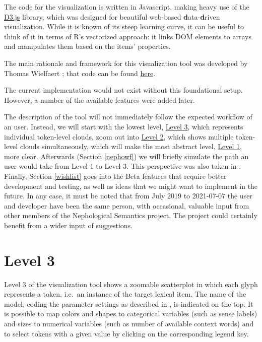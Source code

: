 \documentclass[
]{book}
\begin{document}
The code for the visualization is written in Javascript, making heavy use of the
\href{https://d3.js}{D3.js} library, which was designed for beautiful web-based
\textbf{d}ata-\textbf{d}riven visualization. While it is known of its steep learning curve,
it can be useful to think of it in terms of R's vectorized approach: it links
DOM elements to arrays and manipulates them based on the items' properties.

The main rationale and framework for this visualization tool was developed by
Thomas Wielfaert \autocite{wielfaert.etal_2019}; that code can be found
\href{https://github.com/tokenclouds/tokenclouds.github.io/LeTok/}{here}.

The current implementation would not exist without this foundational setup. However,
a number of the available features were added later.

The description of the tool will not immediately follow the expected workflow of an user.
Instead, we will start with the lowest level, \protect\hyperlink{level_3}{Level 3},
which represents individual token-level clouds,
zoom out into \protect\hyperlink{level_2}{Level 2}, which shows multiple token-level clouds simultaneously,
which will make the most abstract level, \protect\hyperlink{level_1}{Level 1}, more clear.
Afterwards (Section \ref{nephowf}) we will briefly simulate the path an user would take from Level 1 to Level 3.
This perspective was also taken in \textcite{montes.heylen_Submitted}.
Finally, Section \ref{wishlist} goes into the Beta features
that require better development and testing, as well as ideas that we might want to
implement in the future. In any case, it must be noted that from July 2019 to
2021-07-07 the user and developer have been the same person, with occasional,
valuable input from other members of the Nephological Semantics project. The
project could certainly benefit from a wider input of suggestions.

\hypertarget{level_3}{%
\section{Level 3}\label{level_3}}

Level 3 of the visualization tool shows a zoomable scatterplot in which each glyph represents a token, i.e.~an instance of the target lexical item. The name of the model, coding the parameter settings as described in
, is indicated on the top. It is possible to map colors and shapes to categorical variables (such as sense labels) and sizes to numerical variables (such as number of available context words) and to select tokens with a given value by clicking on the corresponding legend key.
\end{document}
